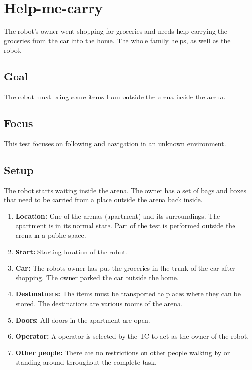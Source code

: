 \section{Help-me-carry}
The robot's owner went shopping for groceries and needs help carrying the groceries from the car into the home.
The whole family helps, as well as the robot. 

\subsection{Goal}
The robot must bring some items from outside the arena inside the arena.

\subsection{Focus}
This test focuses on following and navigation in an unknown environment. 

\subsection{Setup}
The robot starts waiting inside the arena. 
The owner has a set of bags and boxes that need to be carried from a place outside the arena back inside. 

\begin{enumerate}
  \item \textbf{Location:} One of the arenas (apartment) and its surroundings. The apartment is in its normal state. Part of the test is performed outside the arena in a public space.
  \item \textbf{Start:} Starting location of the robot. %
  \item \textbf{Car:} The robots owner has put the groceries in the trunk of the car after shopping. The owner parked the car outside the home.
  \item \textbf{Destinations:} The items must be transported to places where they can be stored. The destinations are various rooms of the arena. 
  \item \textbf{Doors:} All doors in the apartment are open.
  \item \textbf{Operator:} A  operator is selected by the TC to act as the owner of the robot. 
  \item \textbf{Other people:} There are no restrictions on other people walking by or standing around throughout the complete task. 
\end{enumerate}

